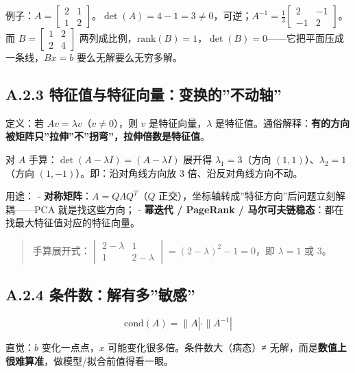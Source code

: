 例子：\(A=\begin{bmatrix}2&1\\1&2\end{bmatrix}\)。\(\det(A)=4-1=3\ne 0\)，可逆；\(A^{-1}=\frac{1}{3}\begin{bmatrix}2&-1\\-1&2\end{bmatrix}\)。而
\(B=\begin{bmatrix}1&2\\2&4\end{bmatrix}\)
两列成比例，\(\mathrm{rank}(B)=1\)，\(\det(B)=0\)------它把平面压成一条线，\(Bx=b\)
要么无解要么无穷多解。

\subsection{A.2.3
特征值与特征向量：变换的''不动轴''}\label{a.2.3-ux7279ux5f81ux503cux4e0eux7279ux5f81ux5411ux91cfux53d8ux6362ux7684ux4e0dux52a8ux8f74}

定义：若 \(Av=\lambda v\)（\(v\ne 0\)），则 \(v\)
是特征向量，\(\lambda\)
是特征值。通俗解释：\textbf{有的方向被矩阵只''拉伸''不''拐弯''，拉伸倍数是特征值}。

对 \(A\) 手算：\(\det(A-\lambda I)=(A-\lambda I)\) 展开得
\(\lambda_1=3\)（方向 \((1,1)\)）、\(\lambda_2=1\)（方向
\((1,-1)\)）。即：沿对角线方向放 3 倍、沿反对角线方向不动。

用途： - \textbf{对称矩阵}：\(A=Q\Lambda Q^T\)（\(Q\)
正交），坐标轴转成''特征方向''后问题立刻解耦------PCA 就是找这些方向； -
\textbf{幂迭代 / PageRank /
马尔可夫链稳态}：都在找最大特征值对应的特征向量。

\begin{quote}
手算展开式：\(\begin{vmatrix}2-\lambda & 1\\1 & 2-\lambda\end{vmatrix}=(2-\lambda)^2-1=0\)，即
\(\lambda=1\) 或 \(3\)。
\end{quote}

\subsection{A.2.4
条件数：解有多''敏感''}\label{a.2.4-ux6761ux4ef6ux6570ux89e3ux6709ux591aux654fux611f}

\[\mathrm{cond}(A)=\|A|\cdot\|A^{-1}|\]

直觉：\(b\) 变化一点点，\(x\) 可能变化很多倍。条件数大（病态）≠
无解，而是\textbf{数值上很难算准}，做模型/拟合前值得看一眼。

